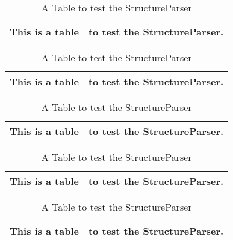 \clearpage

\begin{table}
	\begin{center}\footnotesize
		\begin{tabular}{||c|c||}
			\hline
			This is a table & to test the StructureParser.\\
			\hline
			
			\hline
		\end{tabular}
	\end{center}
	\caption{A Table to test the StructureParser}
\end{table}

\begin{table}
	\begin{center}\footnotesize
		\begin{tabular}{||c|c||}
			\hline
			This is a table & to test the StructureParser.\\
			\hline
			
			\hline
		\end{tabular}
	\end{center}
	\caption{A Table to test the StructureParser}
\end{table}

\clearpage

\begin{table}
	\begin{center}\footnotesize
		\begin{tabular}{||c|c||}
			\hline
			This is a table & to test the StructureParser.\\
			\hline
			
			\hline
		\end{tabular}
	\end{center}
	\caption{A Table to test the StructureParser}
\end{table}

\begin{table}
	\begin{center}\footnotesize
		\begin{tabular}{||c|c||}
			\hline
			This is a table & to test the StructureParser.\\
			\hline
			
			\hline
		\end{tabular}
	\end{center}
	\caption{A Table to test the StructureParser}
\end{table}

\clearpage

\begin{table}
	\begin{center}\footnotesize
		\begin{tabular}{||c|c||}
			\hline
			This is a table & to test the StructureParser.\\
			\hline
			
			\hline
		\end{tabular}
	\end{center}
	\caption{A Table to test the StructureParser}
\end{table}

